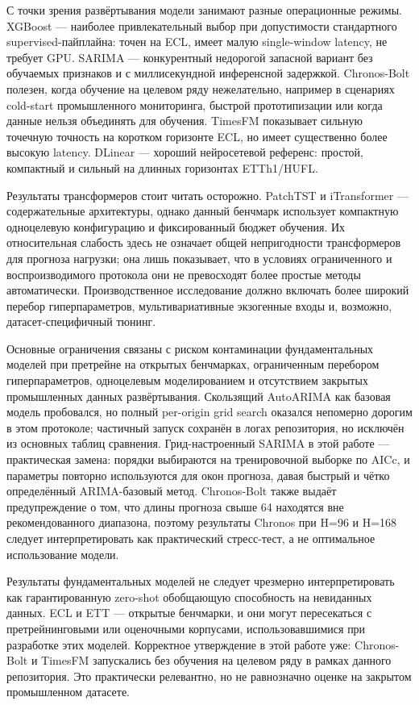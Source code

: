 \documentclass[conference]{IEEEtran}
\begin{document}
С точки зрения развёртывания модели занимают разные операционные режимы. XGBoost --- наиболее привлекательный выбор при допустимости стандартного supervised-пайплайна: точен на ECL, имеет малую single-window latency, не требует GPU. SARIMA --- конкурентный недорогой запасной вариант без обучаемых признаков и с миллисекундной инференсной задержкой. Chronos-Bolt полезен, когда обучение на целевом ряду нежелательно, например в сценариях cold-start промышленного мониторинга, быстрой прототипизации или когда данные нельзя объединять для обучения. TimesFM показывает сильную точечную точность на коротком горизонте ECL, но имеет существенно более высокую latency. DLinear --- хороший нейросетевой референс: простой, компактный и сильный на длинных горизонтах ETTh1/HUFL.

Результаты трансформеров стоит читать осторожно. PatchTST и iTransformer --- содержательные архитектуры, однако данный бенчмарк использует компактную одноцелевую конфигурацию и фиксированный бюджет обучения. Их относительная слабость здесь не означает общей непригодности трансформеров для прогноза нагрузки; она лишь показывает, что в условиях ограниченного и воспроизводимого протокола они не превосходят более простые методы автоматически. Производственное исследование должно включать более широкий перебор гиперпараметров, мультивариативные экзогенные входы и, возможно, датасет-специфичный тюнинг.

Основные ограничения связаны с риском контаминации фундаментальных моделей при претрейне на открытых бенчмарках, ограниченным перебором гиперпараметров, одноцелевым моделированием и отсутствием закрытых промышленных данных развёртывания. Скользящий AutoARIMA как базовая модель пробовался, но полный per-origin grid search оказался непомерно дорогим в этом протоколе; частичный запуск сохранён в логах репозитория, но исключён из основных таблиц сравнения. Грид-настроенный SARIMA в этой работе --- практическая замена: порядки выбираются на тренировочной выборке по AICc, и параметры повторно используются для окон прогноза, давая быстрый и чётко определённый ARIMA-базовый метод. Chronos-Bolt также выдаёт предупреждение о том, что длины прогноза свыше 64 находятся вне рекомендованного диапазона, поэтому результаты Chronos при H=96 и H=168 следует интерпретировать как практический стресс-тест, а не оптимальное использование модели.

Результаты фундаментальных моделей не следует чрезмерно интерпретировать как гарантированную zero-shot обобщающую способность на невиданных данных. ECL и ETT --- открытые бенчмарки, и они могут пересекаться с претрейнинговыми или оценочными корпусами, использовавшимися при разработке этих моделей. Корректное утверждение в этой работе уже: Chronos-Bolt и TimesFM запускались без обучения на целевом ряду в рамках данного репозитория. Это практически релевантно, но не равнозначно оценке на закрытом промышленном датасете.
\end{document}
